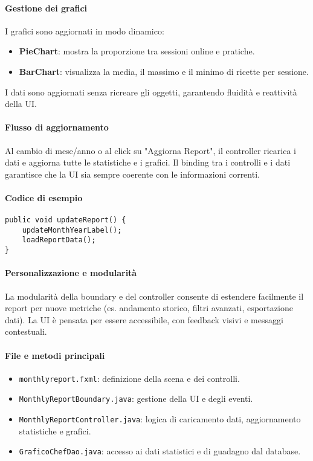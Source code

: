 \paragraph{Gestione dei grafici}
I grafici sono aggiornati in modo dinamico:
\begin{itemize}
    \item \textbf{PieChart}: mostra la proporzione tra sessioni online e pratiche.
    \item \textbf{BarChart}: visualizza la media, il massimo e il minimo di ricette per sessione.
\end{itemize}
I dati sono aggiornati senza ricreare gli oggetti, garantendo fluidità e reattività della UI.

\paragraph{Flusso di aggiornamento}
Al cambio di mese/anno o al click su "Aggiorna Report", il controller ricarica i dati e aggiorna tutte le statistiche e i grafici. Il binding tra i controlli e i dati garantisce che la UI sia sempre coerente con le informazioni correnti.

\paragraph{Codice di esempio}
\begin{verbatim}
public void updateReport() {
    updateMonthYearLabel();
    loadReportData();
}
\end{verbatim}

\paragraph{Personalizzazione e modularità}
La modularità della boundary e del controller consente di estendere facilmente il report per nuove metriche (es. andamento storico, filtri avanzati, esportazione dati). La UI è pensata per essere accessibile, con feedback visivi e messaggi contestuali.

\paragraph{File e metodi principali}
\begin{itemize}
    \item \texttt{monthlyreport.fxml}: definizione della scena e dei controlli.
    \item \texttt{MonthlyReportBoundary.java}: gestione della UI e degli eventi.
    \item \texttt{MonthlyReportController.java}: logica di caricamento dati, aggiornamento statistiche e grafici.
    \item \texttt{GraficoChefDao.java}: accesso ai dati statistici e di guadagno dal database.
\end{itemize}

